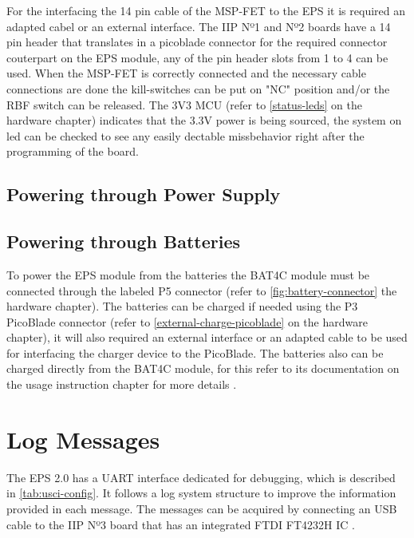 For the interfacing the 14 pin cable of the MSP-FET to the EPS it is required an adapted cabel or an external interface. 
The IIP\cite{iip} Nº1 and Nº2 boards have a 14 pin header that translates in a picoblade connector for the required connector couterpart on the EPS module, any of the pin header slots from 1 to 4 can be used.
When the MSP-FET is correctly connected and the necessary cable connections are done the kill-switches can be put on "NC" position and/or the RBF switch can be released.
The 3V3 MCU (refer to \autoref{status-leds} on the hardware chapter) indicates that the 3.3V power is being sourced, the system on led can be checked to see any easily dectable missbehavior right after the programming of the board. 



\subsection{Powering through Power Supply}


\subsection{Powering through Batteries}

To power the EPS module from the batteries the BAT4C module must be connected through the labeled P5 connector (refer to \autoref{fig:battery-connector} the hardware chapter).
The batteries can be charged if needed using the P3 PicoBlade connector (refer to \autoref{external-charge-picoblade} on the hardware chapter), it will also required an external interface or an adapted cable to be used for interfacing the charger device to the PicoBlade.
The batteries also can be charged directly from the BAT4C module, for this refer to its documentation on the usage instruction chapter for more details \cite{bat4c}.


\section{Log Messages}

The EPS 2.0 has a UART interface dedicated for debugging, which is described in \autoref{tab:usci-config}. It follows a log system structure to improve the information provided in each message.
The messages can be acquired by connecting an USB cable to the IIP Nº3 board that has an integrated FTDI FT4232H IC \cite{iip}.
